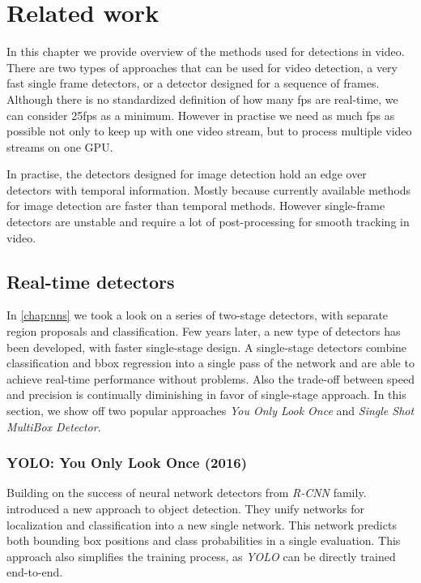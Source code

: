 \chapter{Related work}
\label{chap:related}

In this chapter we provide overview of the methods used for detections in video. There are two types of approaches that can be used for video detection, a very fast single frame detectors, or a detector designed for a sequence of frames. Although there is no standardized definition of how many fps are real-time, we can consider 25fps as a minimum. However in practise we need as much fps as possible not only to keep up with one video stream, but to process multiple video streams on one GPU. 

In practise, the detectors designed for image detection hold an edge over detectors with temporal information. Mostly because currently available methods for image detection are faster than temporal methods. However single-frame detectors are unstable and require a lot of post-processing for smooth tracking in video. 

\section{Real-time detectors}
\label{sec:rltm}
In \cref{chap:nns} we took a look on a series of two-stage detectors, with separate region proposals and classification. Few years later, a new type of detectors has been developed, with faster single-stage design. A single-stage detectors combine classification and bbox regression into a single pass of the network and are able to achieve real-time performance without problems. Also the trade-off between speed and precision is continually diminishing in favor of single-stage approach. In this section, we show off two popular approaches \textit{You Only Look Once} and \textit{Single Shot MultiBox Detector}.

\subsection{YOLO: You Only Look Once (2016)}
\label{sec:yolo}
Building on the success of neural network detectors from \textit{R-CNN} family. \citeauthor{bib:yolo} \cite{bib:yolo} introduced a new approach to object detection. They unify networks for localization and classification into a new single network. This network predicts both bounding box positions and class probabilities in a single evaluation. This approach also simplifies the training process, as \textit{YOLO} can be directly trained end-to-end. 

